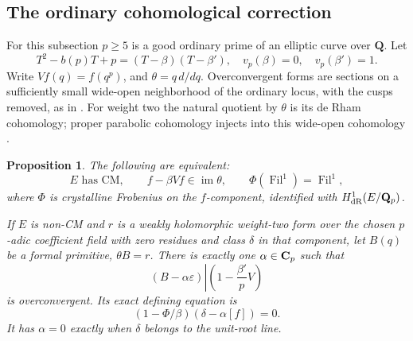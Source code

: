 \documentclass[11pt]{article}
\newtheorem{proposition}[theorem]{Proposition}
\theoremstyle{definition}\newtheorem{definition}[theorem]{Definition}
\theoremstyle{remark}\newtheorem{remark}[theorem]{Remark}
\newcommand{\Q}{\mathbf Q}\newcommand{\Z}{\mathbf Z}
\begin{document}
\subsection{The ordinary cohomological correction}
For this subsection $p\ge5$ is a good ordinary prime of an elliptic curve over $\Q$. Let
\[
 T^2-b(p)T+p=(T-\beta)(T-\beta'),\quad v_p(\beta)=0,\quad v_p(\beta')=1.
\]
Write $Vf(q)=f(q^p)$, and $\theta=q\,d/dq$. Overconvergent forms are sections on a sufficiently small wide-open neighborhood of the ordinary locus, with the cusps removed, as in \cite[Definition 3.1, pp.~5--6]{CandeloriCastella}. For weight two the natural quotient by $\theta$ is its de Rham cohomology; proper parabolic cohomology injects into this wide-open cohomology \cite[Theorem 3.3 and (6), pp.~5--6]{CandeloriCastella}.

\begin{proposition}\label{prop:ordinary-theta-criterion}
The following are equivalent:
\[
 E\text{ has CM},\qquad f-\beta Vf\in\operatorname{im}\theta,\qquad
       \Phi(\operatorname{Fil}^1)=\operatorname{Fil}^1,
\]
where $\Phi$ is crystalline Frobenius on the $f$-component, identified with $H^1_{\dR}(E/\Q_p)$.

If $E$ is non-CM and $r$ is a weakly holomorphic weight-two form over the chosen $p$-adic coefficient field with zero residues and class $\delta$ in that component, let $B(q)$ be a formal primitive, $\theta B=r$. There is exactly one $\alpha\in\mathbf C_p$ such that
\[
              (B-\alpha\varepsilon)\left|\left(1-\frac{\beta'}pV\right)\right.
\]
is overconvergent. Its exact defining equation is
\[
                      (1-\Phi/\beta)(\delta-\alpha[f])=0.
\]
It has $\alpha=0$ exactly when $\delta$ belongs to the unit-root line.
\end{proposition}
\end{document}
